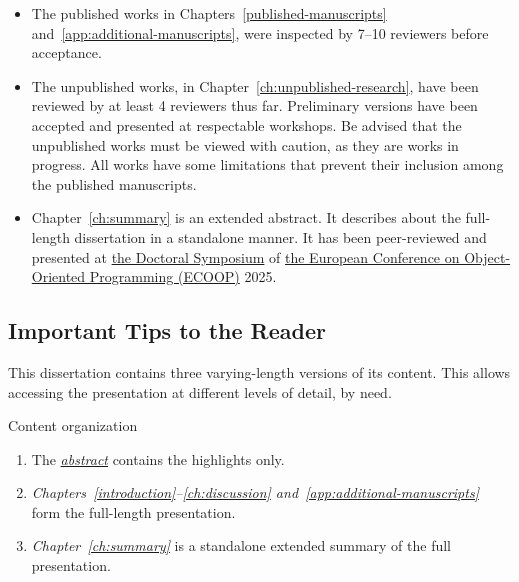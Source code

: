 \begin{itemize}

\item The published works in Chapters~\autoref{published-manuscripts}
and~\autoref{app:additional-manuscripts}, were inspected by 7--10 reviewers
before acceptance.

\item The unpublished works, in Chapter~\autoref{ch:unpublished-research}, have
been reviewed by at least 4 reviewers thus far. Preliminary versions have been
accepted and presented at respectable workshops. Be advised that the unpublished
works must be viewed with caution, as they are works in progress. All works have
some limitations that prevent their inclusion among the published manuscripts.

\item Chapter~\autoref{ch:summary} is an extended abstract. It describes about
the full-length dissertation in a standalone manner. It has been peer-reviewed
and presented at
\href{https://2025.ecoop.org/track/ecoop-2025-doctoral-symposium}{the Doctoral
Symposium} of \href{https://2025.ecoop.org}{the European Conference on
Object-Oriented Programming (ECOOP)} 2025.

\end{itemize}

\subsection{Important Tips to the Reader}
\label{subsec:tips}

This dissertation contains three varying-length versions of its content.
This allows accessing the presentation at different levels of detail, by need.

\begin{infobox}[]{Content organization}
\begin{enumerate}[wide, labelwidth=!, labelindent=0pt]

\item The \emph{\hyperref[abs]{abstract}} contains the highlights only.

\item \emph{Chapters~\autoref{introduction}--\autoref{ch:discussion}
and~\autoref{app:additional-manuscripts}} form the full-length presentation.

\item \emph{Chapter~\autoref{ch:summary}} is a standalone extended summary of
the full presentation.
\end{enumerate}
\end{infobox}

